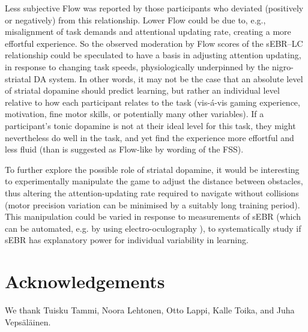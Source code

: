 \documentclass[10pt,letterpaper,floatsintext]{article}
\begin{document}
Less subjective Flow was reported by those participants who deviated (positively or negatively) from this relationship. Lower Flow could be due to, e.g., misalignment of task demands and attentional updating rate, creating a more effortful experience. So the observed moderation by Flow scores of the sEBR--LC relationship could be speculated to have a basis in adjusting attention updating, in response to changing task speeds, physiologically underpinned by the nigro-striatal DA system. In other words, it may not be the case that an absolute level of striatal dopamine should predict learning, but rather an individual level relative to how each participant relates to the task (vis-\'{a}-vis gaming experience, motivation, fine motor skills, or potentially many other variables). If a participant's tonic dopamine is not at their ideal level for this task, they might nevertheless do well in the task, and yet find the experience more effortful and less fluid (than is suggested as Flow-like by wording of the FSS).


To further explore the possible role of striatal dopamine, it would be interesting to experimentally manipulate the game to adjust the distance between obstacles, thus altering the attention-updating rate required to navigate without collisions (motor precision variation can be minimised by a suitably long training period). This manipulation could be varied in response to measurements of sEBR (which can be automated, e.g. by using electro-oculography \cite{toivanen2014}), to systematically study if sEBR has explanatory power for individual variability in learning.





\section{Acknowledgements}
We thank Tuisku Tammi, Noora Lehtonen, Otto Lappi, Kalle Toika, and Juha Veps\"{a}l\"{a}inen.





\setlength{\bibleftmargin}{.125in}
\setlength{\bibindent}{-\bibleftmargin}


\end{document}
